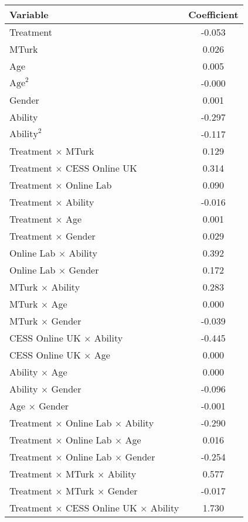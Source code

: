 \begin{table}[]
\centering
\begin{tabular}{lc}
  \hline
Variable & Coefficient \\ 
  \hline
Treatment & -0.053 \\ 
  MTurk & 0.026 \\ 
  Age & 0.005 \\ 
  $\text{Age}^2$ & -0.000 \\ 
  Gender & 0.001 \\ 
  Ability & -0.297 \\ 
  $\text{Ability}^2$ & -0.117 \\ 
  Treatment $\times$ MTurk & 0.129 \\ 
  Treatment $\times$ CESS Online UK & 0.314 \\ 
  Treatment $\times$ Online Lab & 0.090 \\ 
  Treatment $\times$ Ability & -0.016 \\ 
  Treatment $\times$ Age & 0.001 \\ 
  Treatment $\times$ Gender & 0.029 \\ 
  Online Lab $\times$ Ability & 0.392 \\ 
  Online Lab $\times$ Gender & 0.172 \\ 
  MTurk $\times$ Ability & 0.283 \\ 
  MTurk $\times$ Age & 0.000 \\ 
  MTurk $\times$ Gender & -0.039 \\ 
  CESS Online UK $\times$ Ability & -0.445 \\ 
  CESS Online UK $\times$ Age & 0.000 \\ 
  Ability $\times$ Age & 0.000 \\ 
  Ability $\times$ Gender & -0.096 \\ 
  Age $\times$ Gender & -0.001 \\ 
  Treatment $\times$ Online Lab $\times$ Ability & -0.290 \\ 
  Treatment $\times$ Online Lab $\times$ Age & 0.016 \\ 
  Treatment $\times$ Online Lab $\times$ Gender & -0.254 \\ 
  Treatment $\times$ MTurk $\times$ Ability & 0.577 \\ 
  Treatment $\times$ MTurk $\times$ Gender & -0.017 \\ 
  Treatment $\times$ CESS Online UK $\times$ Ability & 1.730 \\ 

\end{tabular}
\end{table}
